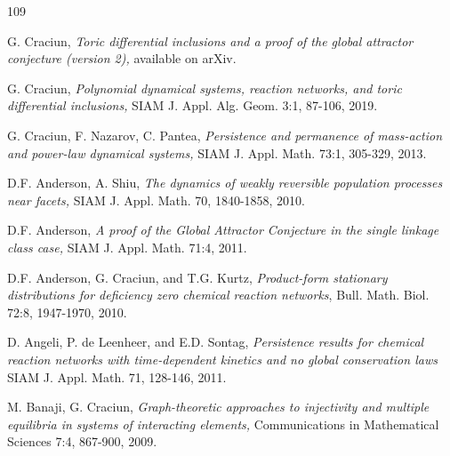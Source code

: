 \documentclass[12pt,letterpaper]{article}
\begin{document}
\bigskip



\bigskip



\bigskip



\bigskip



\bigskip



\bigskip



{}
{}

\begin{thebibliography}{109}


G. Craciun, 
{\em Toric differential inclusions and a proof of the global attractor conjecture (version 2),}  available on arXiv. 

G. Craciun, 
{\em Polynomial dynamical systems, reaction networks, and toric differential inclusions,}  SIAM J. Appl. Alg. Geom. 3:1, 87-106, 2019. 

G. Craciun, F. Nazarov, C. Pantea, 
{\em Persistence and permanence of mass-action and power-law dynamical systems,}  SIAM J. Appl. Math. 73:1, 305-329, 2013. 

D.F. Anderson, A. Shiu,
{\em The dynamics of weakly reversible population processes near facets,} SIAM J. Appl. Math. 70, 1840-1858, 2010.

D.F. Anderson,
{\em A proof of the Global Attractor Conjecture in the single linkage class case,} SIAM J. Appl. Math. 71:4, 2011.

D.F. Anderson, G. Craciun, and T.G. Kurtz, 
{\em Product-form stationary distributions for deficiency zero chemical reaction networks}, Bull. Math. Biol. 72:8, 1947-1970, 2010.


D. Angeli, P. de Leenheer, and E.D. Sontag,
{\em Persistence results for chemical reaction networks with time-dependent kinetics and no global conservation laws} 
SIAM J. Appl. Math. 71, 128-146, 2011.

M. Banaji, G. Craciun, 
{\em Graph-theoretic approaches to injectivity and multiple equilibria in systems of interacting elements,}
Communications in Mathematical Sciences 7:4, 867-900, 2009.


\end{thebibliography}
\end{document}
